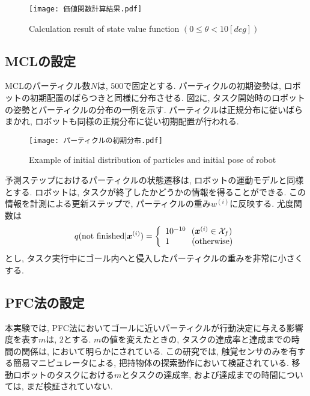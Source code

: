 \begin{figure}[H]
  \begin{center}
    \texttt{[image: 価値関数計算結果.pdf]}
    \caption{Calculation result of state value function $(0 \leq \theta < 10 \si{[deg]})$}
    \label{fig:価値関数計算結果}
  \end{center}
\end{figure}

\subsection{MCLの設定}
MCLのパーティクル数$N$は, $500$で固定とする. 
パーティクルの初期姿勢は, ロボットの初期配置のばらつきと同様に分布させる. 
図\ref{fig:パーティクルの初期分布}に, タスク開始時のロボットの姿勢とパーティクルの分布の一例を示す. 
パーティクルは正規分布に従いばらまかれ, ロボットも同様の正規分布に従い初期配置が行われる. 

\begin{figure}[H]
  \begin{center}
    \texttt{[image: パーティクルの初期分布.pdf]}
    \caption{Example of initial distribution of particles and initial pose of robot}
    \label{fig:パーティクルの初期分布}
  \end{center}
\end{figure}

予測ステップにおけるパーティクルの状態遷移は, ロボットの運動モデルと同様とする. 
ロボットは, タスクが終了したかどうかの情報を得ることができる. 
この情報を計測による更新ステップで, パーティクルの重み$w^{(i)}$に反映する. 
尤度関数は
\begin{equation}
  q({\rm not \  finished} | \bm{x}^{(i)}) =
  \left\{
    \begin{array}{l}
      10^{-10} \ \ (\bm{x}^{(i)} \in \mathcal{X}_{f}) \\
      1 \quad \quad \ \ ({\rm otherwise})
    \end{array}
  \right.
\end{equation}
とし, タスク実行中にゴール内へと侵入したパーティクルの重みを非常に小さくする. 

\subsection{PFC法の設定}
本実験では, PFC法においてゴールに近いパーティクルが行動決定に与える影響度を表す$m$は, $2$とする. 
$m$の値を変えたときの, タスクの達成率と達成までの時間の関係は, \cite{ueda2018searching}において明らかにされている. 
この研究では, 触覚センサのみを有する簡易マニピュレータによる, 把持物体の探索動作において検証されている. 
移動ロボットのタスクにおける$m$とタスクの達成率, および達成までの時間については, まだ検証されていない. 

